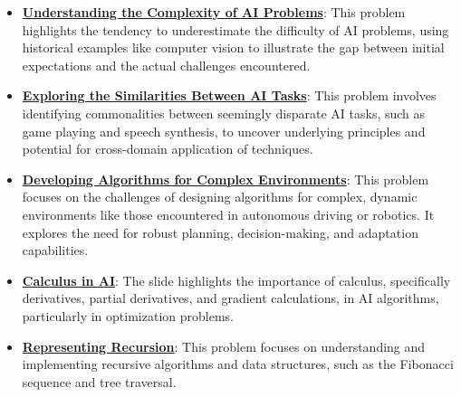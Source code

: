 \documentclass{article}%
\begin{document}
\begin{itemize}[leftmargin=*]
\item \href{https://purdue.brightspace.com/d2l/common/assets/pdfjs-d2l-dist/1.0.14-legacy/web/viewer.html?file=\%2Fcontent\%2Fenforced\%2F1095467-wl.202510.CS.24300.001\%2F02L2-Intro.pdf\%3Fou\%3D1095467\&lang=en-us\&container=d2l-fileviewer-rendered-pdf\&fullscreen=d2l-fileviewer-rendered-pdf-dialog\&height=667#page=15}{\textbf{Understanding the Complexity of AI Problems}}: This problem highlights the tendency to underestimate the difficulty of AI problems, using historical examples like computer vision to illustrate the gap between initial expectations and the actual challenges encountered.%
\item \href{https://purdue.brightspace.com/d2l/common/assets/pdfjs-d2l-dist/1.0.14-legacy/web/viewer.html?file=\%2Fcontent\%2Fenforced\%2F1095467-wl.202510.CS.24300.001\%2F02L2-Intro.pdf\%3Fou\%3D1095467\&lang=en-us\&container=d2l-fileviewer-rendered-pdf\&fullscreen=d2l-fileviewer-rendered-pdf-dialog\&height=667#page=31}{\textbf{Exploring the Similarities Between AI Tasks}}: This problem involves identifying commonalities between seemingly disparate AI tasks, such as game playing and speech synthesis, to uncover underlying principles and potential for cross-domain application of techniques.%
\item \href{https://purdue.brightspace.com/d2l/common/assets/pdfjs-d2l-dist/1.0.14-legacy/web/viewer.html?file=\%2Fcontent\%2Fenforced\%2F1095467-wl.202510.CS.24300.001\%2F02L2-Intro.pdf\%3Fou\%3D1095467\&lang=en-us\&container=d2l-fileviewer-rendered-pdf\&fullscreen=d2l-fileviewer-rendered-pdf-dialog\&height=667#page=27}{\textbf{Developing Algorithms for Complex Environments}}: This problem focuses on the challenges of designing algorithms for complex, dynamic environments like those encountered in autonomous driving or robotics. It explores the need for robust planning, decision-making, and adaptation capabilities.%
\item \href{https://purdue.brightspace.com/d2l/common/assets/pdfjs-d2l-dist/1.0.14-legacy/web/viewer.html?file=\%2Fcontent\%2Fenforced\%2F1095467-wl.202510.CS.24300.001\%2F04L1-Linear Algebra Primer.pdf\%3Fou\%3D1095467\&lang=en-us\&container=d2l-fileviewer-rendered-pdf\&fullscreen=d2l-fileviewer-rendered-pdf-dialog\&height=667#page=19}{\textbf{Calculus in AI}}: The slide highlights the importance of calculus, specifically derivatives, partial derivatives, and gradient calculations, in AI algorithms, particularly in optimization problems.%
\item \href{https://purdue.brightspace.com/d2l/common/assets/pdfjs-d2l-dist/1.0.14-legacy/web/viewer.html?file=\%2Fcontent\%2Fenforced\%2F1095467-wl.202510.CS.24300.001\%2F14L1-DepthFS.pdf\%3Fou\%3D1095467\&lang=en-us\&container=d2l-fileviewer-rendered-pdf\&fullscreen=d2l-fileviewer-rendered-pdf-dialog\&height=667#page=3}{\textbf{Representing Recursion}}: This problem focuses on understanding and implementing recursive algorithms and data structures, such as the Fibonacci sequence and tree traversal.%

\end{itemize}
\end{document}
